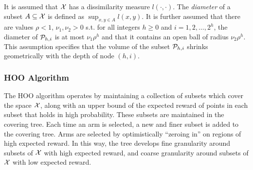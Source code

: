 It is assumed that ${\mathcal{X}}$ has a dissimilarity measure
$l(\cdot,\cdot)$. The \emph{diameter} of a subset $A \subseteq {\mathcal{X}}$ is
defined as $\sup_{x,y \in A}l(x,y)$. It is further assumed that there
are values $\rho < 1$, $\nu_1, \nu_2 > 0$ s.t. for all integers $h
\geq 0$ and $i = 1,2, \dots, 2^h$, the diameter of ${\mathcal{P}}_{h,i}$ is at
most $\nu_1 \rho^h$ and that it contains an open ball of radius $\nu_2
\rho^h$. This assumption specifies that the volume of the subset
${\mathcal{P}}_{h,i}$ shrinks geometrically with the depth of node $(h,i)$.

\subsubsection{HOO Algorithm}
The HOO algorithm operates by maintaining a collection of subsets
which cover the space ${\mathcal{X}}$, along with an upper bound of the expected
reward of points in each subset that holds in high probability. These
subsets are maintained in the covering tree. Each time an arm is
selected, a new and finer subset is added to the covering tree. Arms
are selected by optimistically ``zeroing in'' on regions of high
expected reward. In this way, the tree develops fine granularity
around subsets of ${\mathcal{X}}$ with high expected reward, and coarse
granularity around subsets of ${\mathcal{X}}$ with low expected reward.


